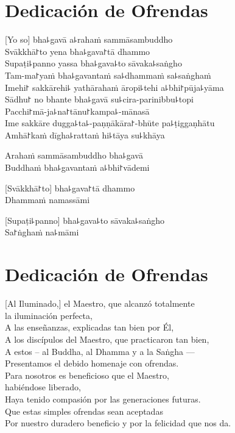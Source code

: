\chapter*{Dedicación de Ofrendas}

\delegateSetUseNext

[Yo so] bha꜕gavā a꜕rahaṁ sammāsambuddho\\
Svākkhā꜓to yena bha꜕gava꜓tā dhammo\\
Supaṭi꜕panno yassa bha꜕gava꜕to sāvaka꜕saṅgho\\
Tam-ma꜓yaṁ bha꜕gavantaṁ sa꜕dhammaṁ sa꜕saṅghaṁ\\
Imehi꜓ sakkārehi꜕ yathārahaṁ āropi꜕tehi a꜕bhi꜓pūja꜕yāma\\
Sādhu꜓ no bhante bha꜕gavā su꜕cira-parinibbu꜕topi\\
Pacchi꜓mā-ja꜕na꜓tānu꜓kampa꜕-mānasā\\
Ime sakkāre dugga꜕ta꜕-paṇṇākāra꜓-bhūte pa꜕ṭiggaṇhātu\\
Amhā꜓kaṁ dīgha꜕rattaṁ hi꜕tāya su꜕khāya

Arahaṁ sammāsambuddho bha꜕gavā\\
Buddhaṁ bha꜕gavantaṁ a꜕bhi꜓vādemi 

[Svākkhā꜓to] bha꜕gava꜓tā dhammo\\
Dhammaṁ namassāmi 

[Supaṭi꜕panno] bha꜕gava꜕to sāvaka꜕saṅgho\\
Sa꜓ṅghaṁ na꜕māmi 

\clearpage

\chapter{Dedicación de Ofrendas}

[Al Iluminado,] el Maestro, que alcanzó totalmente\\
\vin la iluminación perfecta,\\
A las enseñanzas, explicadas tan bien por Él,\\
A los discípulos del Maestro, que practicaron tan bien,\\
A estos – al Buddha, al Dhamma y a la Saṅgha ---\\
Presentamos el debido homenaje con ofrendas.\\
Para nosotros es beneficioso que el Maestro,\\
\vin habiéndose liberado,\\
Haya tenido compasión por las generaciones futuras.\\
Que estas simples ofrendas sean aceptadas\\
Por nuestro duradero beneficio y por la felicidad que nos da.

